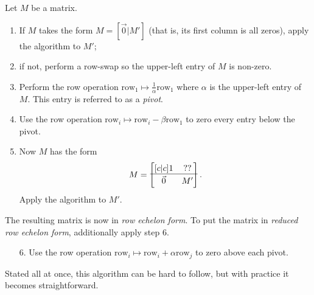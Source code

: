 \begin{definition}
	Let $M$ be a matrix.
	\begin{enumerate}
		\item If $M$ takes the form $M=[\vec 0|M']$ (that is, its first column
		is all zeros), apply the algorithm to $M'$;
		\item if not, perform a row-swap so the upper-left entry of $M$ is
			non-zero.
		\item Perform the row operation $\text{row}_1\mapsto \tfrac{1}{\alpha}\text{row}_1$
		where $\alpha$ is the upper-left entry of $M$. This entry is referred to as
		a \emph{pivot}.
		\item Use the row operation $\text{row}_i\mapsto \text{row}_i-\beta\text{row}_1$
		to zero every entry below the pivot.
		\item Now $M$ has the form
		\[
			M=\begin{bmatrix}[c|c]
				1 & ??\\
				\hline\\[\dimexpr-\normalbaselineskip+2pt]
				\vec 0 & M'
			\end{bmatrix}.
		\]
		Apply the algorithm to $M'$.

	\end{enumerate}

	The resulting matrix is now in \emph{row echelon form}. To put the matrix in 
	\emph{reduced row echelon form}, additionally apply step 6.
	\begin{enumerate}
		\item[6.] Use the row operation $\text{row}_i\mapsto \text{row}_i+\alpha\text{row}_j$
		to zero above each pivot.
	\end{enumerate}
\end{definition}

Stated all at once, this algorithm can be hard to follow, but with practice it becomes
straightforward.

